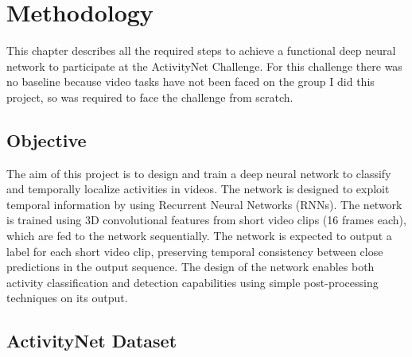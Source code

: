 \chapter{Methodology}

This chapter describes all the required steps to achieve a functional deep neural network to participate at the ActivityNet Challenge. For this challenge there was no baseline because video tasks have not been faced on the group I did this project, so was required to face the challenge from scratch.


\section{Objective}

The aim of this project is to design and train a deep neural network to classify and temporally localize activities in videos. The network is designed to exploit temporal information by using Recurrent Neural Networks (RNNs). The network is trained using 3D convolutional features from short video clips (16 frames each), which are fed to the network sequentially. The network is expected to output a label for each short video clip, preserving temporal consistency between close predictions in the output sequence. The design of the network enables both activity classification and detection capabilities using simple post-processing techniques on its output.



\section{ActivityNet Dataset}

